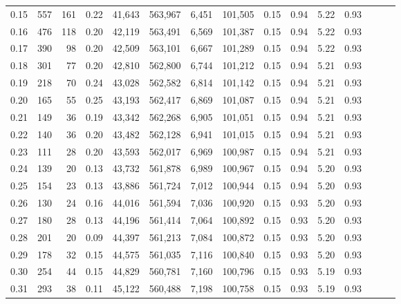 \begin{tabular}{rrrrrrrrrrrrrrr}
0.15 &     557 &     161 &  0.22 &   41,643 &  563,967 &    6,451 &  101,505 &  0.15 &  0.94 &  5.22 &      0.93 \\
0.16 &     476 &     118 &  0.20 &   42,119 &  563,491 &    6,569 &  101,387 &  0.15 &  0.94 &  5.22 &      0.93 \\
0.17 &     390 &      98 &  0.20 &   42,509 &  563,101 &    6,667 &  101,289 &  0.15 &  0.94 &  5.22 &      0.93 \\
0.18 &     301 &      77 &  0.20 &   42,810 &  562,800 &    6,744 &  101,212 &  0.15 &  0.94 &  5.21 &      0.93 \\
0.19 &     218 &      70 &  0.24 &   43,028 &  562,582 &    6,814 &  101,142 &  0.15 &  0.94 &  5.21 &      0.93 \\
0.20 &     165 &      55 &  0.25 &   43,193 &  562,417 &    6,869 &  101,087 &  0.15 &  0.94 &  5.21 &      0.93 \\
0.21 &     149 &      36 &  0.19 &   43,342 &  562,268 &    6,905 &  101,051 &  0.15 &  0.94 &  5.21 &      0.93 \\
0.22 &     140 &      36 &  0.20 &   43,482 &  562,128 &    6,941 &  101,015 &  0.15 &  0.94 &  5.21 &      0.93 \\
0.23 &     111 &      28 &  0.20 &   43,593 &  562,017 &    6,969 &  100,987 &  0.15 &  0.94 &  5.21 &      0.93 \\
0.24 &     139 &      20 &  0.13 &   43,732 &  561,878 &    6,989 &  100,967 &  0.15 &  0.94 &  5.20 &      0.93 \\
0.25 &     154 &      23 &  0.13 &   43,886 &  561,724 &    7,012 &  100,944 &  0.15 &  0.94 &  5.20 &      0.93 \\
0.26 &     130 &      24 &  0.16 &   44,016 &  561,594 &    7,036 &  100,920 &  0.15 &  0.93 &  5.20 &      0.93 \\
0.27 &     180 &      28 &  0.13 &   44,196 &  561,414 &    7,064 &  100,892 &  0.15 &  0.93 &  5.20 &      0.93 \\
0.28 &     201 &      20 &  0.09 &   44,397 &  561,213 &    7,084 &  100,872 &  0.15 &  0.93 &  5.20 &      0.93 \\
0.29 &     178 &      32 &  0.15 &   44,575 &  561,035 &    7,116 &  100,840 &  0.15 &  0.93 &  5.20 &      0.93 \\
0.30 &     254 &      44 &  0.15 &   44,829 &  560,781 &    7,160 &  100,796 &  0.15 &  0.93 &  5.19 &      0.93 \\
0.31 &     293 &      38 &  0.11 &   45,122 &  560,488 &    7,198 &  100,758 &  0.15 &  0.93 &  5.19 &      0.93 \\

\end{tabular}
